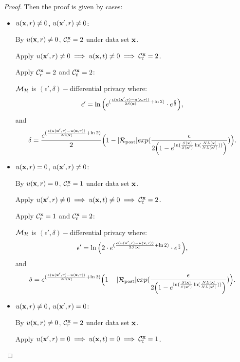 \documentclass{article}
\begin{document}
\begin{proof}
 Then the proof is given by cases:
  \begin{itemize}
    \item {\boldmath$u(\textbf{x}, {r}) \neq 0$, $u(\textbf{x}', {r}) \neq 0$}:

      By $u(\textbf{x}, {r}) \neq 0$, $\mathcal{C}^{\textbf{x}}_{r} = 2$ under data set $\textbf{x}$.

      Apply $u(\textbf{x}', {r}) \neq 0 \implies u(\textbf{x}, {t}) \neq 0 \implies \mathcal{C}^{\textbf{x}}_{t} = 2$.

      Apply  $\mathcal{C}^{\textbf{x}}_{r} = 2$ and  $\mathcal{C}^{\textbf{x}}_{t} = 2$:

      $\mathcal{M}_{\mathcal{H}}$ is $(\epsilon', \delta)-$differential privacy where:
      $$
      \epsilon' = \ln \Big( e^{(\frac{\epsilon (u(\textbf{x}', {r}) - u(\textbf{x}, {r}))}{2 S(\textbf{x})} + \ln 2)} \cdot e^{\frac{\epsilon}{2}} \Big),
      $$ and
      $$
      \delta = \frac{e^{(\frac{\epsilon (u(\textbf{x}', {r}) - u(\textbf{x}, {r}))}{2 S(\textbf{x})} + \ln 2)}}{2}
      \Big( 1 - |\mathcal{R}_{\textup{post}}|exp(\frac{\epsilon}{2 \Big(1 - e ^ {\ln(\frac{S(\textbf{x})}{S(\textbf{x}')} \ln(\frac{NL(\textbf{x})}{NL(\textbf{x}')}))} \Big)}) \Big).
      $$ 

    \item {\boldmath$u(\textbf{x}, {r}) = 0$, $u(\textbf{x}', {r}) \neq 0$}:

      By $u(\textbf{x}, {r}) = 0$, $\mathcal{C}^{\textbf{x}}_{r} = 1$ under data set $\textbf{x}$.
      
      Apply $u(\textbf{x}', {r}) \neq 0 \implies u(\textbf{x}, {t}) \neq 0 \implies \mathcal{C}^{\textbf{x}}_{t} = 2$.

      Apply  $\mathcal{C}^{\textbf{x}}_{r} = 1$ and  $\mathcal{C}^{\textbf{x}}_{t} = 2$:

      $\mathcal{M}_{\mathcal{H}}$ is $(\epsilon', \delta)-$differential privacy where:
      $$
      \epsilon' = \ln \Big( 2 \cdot e^{(\frac{\epsilon (u(\textbf{x}', {r}) - u(\textbf{x}, {r}))}{2 S(\textbf{x})} + \ln 2)} \cdot e^{\frac{\epsilon}{2}} \Big),
      $$ and
      $$
      \delta = e^{(\frac{\epsilon (u(\textbf{x}', {r}) - u(\textbf{x}, {r}))}{2 S(\textbf{x})} + \ln 2)}
      \Big( 1 - |\mathcal{R}_{\textup{post}}|exp(\frac{\epsilon}{2 \Big( 1 - e ^ {\ln(\frac{S(\textbf{x})}{S(\textbf{x}')} \ln(\frac{NL(\textbf{x})}{NL(\textbf{x}')}))}\Big) }) \Big).
      $$ 
      

    \item {\boldmath$u(\textbf{x}, {r}) \neq 0$, $u(\textbf{x}', {r}) = 0$}:

      By $u(\textbf{x}, {r}) \neq 0$, $\mathcal{C}^{\textbf{x}}_{r} = 2$ under data set $\textbf{x}$.
      
      Apply $u(\textbf{x}', {r}) = 0 \implies u(\textbf{x}, {t}) = 0 \implies \mathcal{C}^{\textbf{x}}_{t} = 1$.


\end{itemize}
\end{proof}
\end{document}

